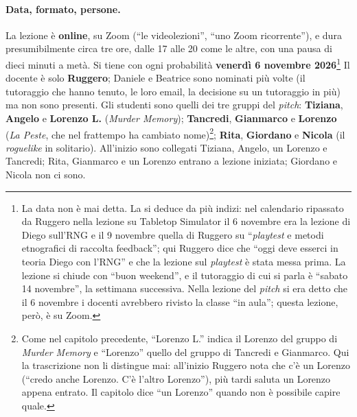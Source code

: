 \paragraph{Data, formato, persone.} La lezione è \textbf{online}, su Zoom (``le
videolezioni'', ``uno Zoom ricorrente''), e dura presumibilmente circa tre ore, dalle 17 alle 20 come le altre, con una pausa di dieci
minuti a metà. Si tiene con ogni probabilità \textbf{venerdì 6 novembre
2026}\footnote{La data non è mai detta. La si deduce da più indizi: nel calendario
ripassato da Ruggero nella lezione su Tabletop Simulator il 6 novembre era la lezione di
Diego sull'RNG e il 9 novembre quella di Ruggero su ``\emph{playtest} e metodi
etnografici di raccolta feedback''; qui Ruggero dice che ``oggi deve esserci in teoria
Diego con l'RNG'' e che la lezione sul \emph{playtest} è stata messa prima. La lezione si
chiude con ``buon weekend'', e il tutoraggio di cui si parla è ``sabato 14 novembre'',
la settimana successiva. Nella lezione del \emph{pitch} si era detto che il 6 novembre
i docenti avrebbero rivisto la classe ``in aula''; questa lezione, però, è su Zoom.} Il
docente è solo \textbf{Ruggero}; Daniele e Beatrice sono nominati più volte (il
tutoraggio che hanno tenuto, le loro email, la decisione su un tutoraggio in più) ma
non sono presenti. Gli studenti sono quelli dei tre gruppi del \emph{pitch}:
\textbf{Tiziana}, \textbf{Angelo} e \textbf{Lorenzo L.} (\emph{Murder Memory});
\textbf{Tancredi}, \textbf{Gianmarco} e \textbf{Lorenzo} (\emph{La Peste}, che nel
frattempo ha cambiato nome)\footnote{Come nel capitolo precedente, ``Lorenzo L.'' indica
il Lorenzo del gruppo di \emph{Murder Memory} e ``Lorenzo'' quello del gruppo di Tancredi
e Gianmarco. Qui la trascrizione non li distingue mai: all'inizio Ruggero nota che c'è
un Lorenzo (``credo anche Lorenzo. C'è l'altro Lorenzo''), più tardi saluta un Lorenzo
appena entrato. Il capitolo dice ``un Lorenzo'' quando non è possibile capire quale.};
\textbf{Rita}, \textbf{Giordano} e \textbf{Nicola} (il \emph{roguelike} in solitario).
All'inizio sono collegati Tiziana, Angelo, un Lorenzo e Tancredi; Rita, Gianmarco e un Lorenzo entrano a lezione iniziata; Giordano e
Nicola non ci sono.

